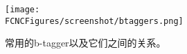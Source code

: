 \begin{figure}[H]
\centering
\texttt{[image: \\FCNCFigures/screenshot/btaggers.png]}
\caption{常用的b-tagger以及它们之间的关系。}
\label{fig:btaggers}
\end{figure}